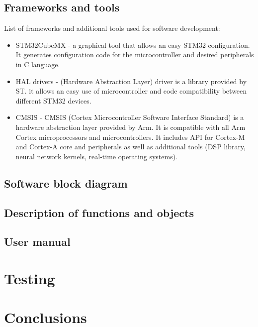 \documentclass{article}
\begin{document}
\subsection{Frameworks and tools}
List of frameworks and additional tools used for software development:

\begin{itemize}
    \item STM32CubeMX
    - a graphical tool that allows an easy STM32 configuration.
    It generates configuration code for the microcontroller and desired peripherals in C language.
    \item HAL drivers
    - (Hardware Abstraction Layer) driver is a library provided by ST.
    it allows an easy use of microcontroller and code compatibility between different STM32 devices.
    \item CMSIS
    - CMSIS (Cortex Microcontroller Software Interface Standard) is a hardware abstraction layer provided by Arm.
    It is compatible with all Arm Cortex microprocessors and microcontrollers.
    It includes API for Cortex-M and Cortex-A core and peripherals as well as additional tools
    (DSP library, neural network kernels, real-time operating systems).
\end{itemize}

\subsection{Software block diagram}

\subsection{Description of functions and objects}

\subsection{User manual}

\newpage



\section{Testing}

\newpage



\section{Conclusions}
\end{document}
